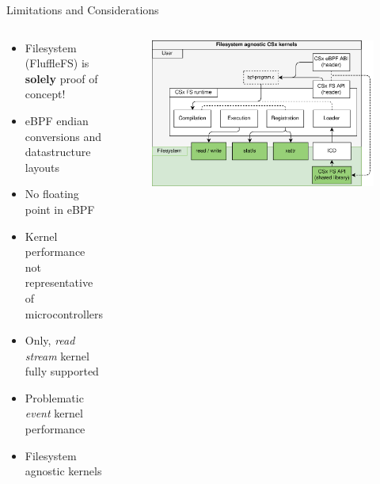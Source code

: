 \documentclass[aspectratio=169]{beamer}
\begin{document}
\begin{frame}{Limitations and Considerations}
    \begin{columns}
        \begin{column}{0.50\textwidth}
            \footnotesize
            \begin{itemize}
                \item Filesystem (FluffleFS) is \textbf{solely} proof of
                      concept!
                \item eBPF endian conversions and datastructure layouts
                \item No floating point in eBPF
                \item Kernel performance not representative of microcontrollers
                \item Only, \textit{read stream} kernel fully supported
                \item Problematic \textit{event} kernel performance
                \item Filesystem agnostic kernels
            \end{itemize}
            \textit{}
        \end{column}
        \begin{column}{0.50\textwidth}
            \begingroup
            \small
            \begin{figure}
                \centering
                \includegraphics[width=1\textwidth]{resources/images/csx-fs-agnostic.png}
            \end{figure}
            \endgroup
        \end{column}
    \end{columns}
\end{frame}
\end{document}
